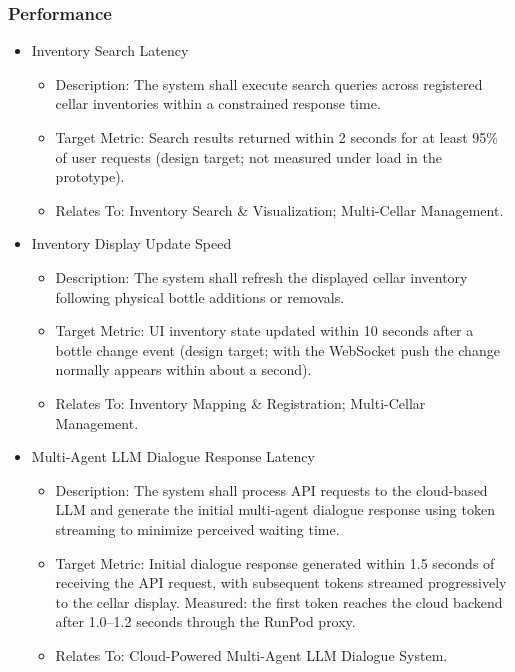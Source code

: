 \documentclass[conference]{IEEEtran}
\begin{document}
\subsubsection{Performance}
\begin{itemize}
    \item Inventory Search Latency
    \begin{itemize}
        \item Description: The system shall execute search queries across registered cellar inventories within a constrained response time.
        \item Target Metric: Search results returned within 2 seconds for at least 95\% of user requests (design target; not measured under load in the prototype).
        \item Relates To: Inventory Search \& Visualization; Multi-Cellar Management.
    \end{itemize}

    \item Inventory Display Update Speed
    \begin{itemize}
        \item Description: The system shall refresh the displayed cellar inventory following physical bottle additions or removals.
        \item Target Metric: UI inventory state updated within 10 seconds after a bottle change event (design target; with the WebSocket push the change normally appears within about a second).
        \item Relates To: Inventory Mapping \& Registration; Multi-Cellar Management.
    \end{itemize}

    \item Multi-Agent LLM Dialogue Response Latency
    \begin{itemize}
        \item Description: The system shall process API requests to the cloud-based LLM and generate the initial multi-agent dialogue response using token streaming to minimize perceived waiting time.
        \item Target Metric: Initial dialogue response generated within 1.5 seconds of receiving the API request, with subsequent tokens streamed progressively to the cellar display. Measured: the first token reaches the cloud backend after 1.0--1.2 seconds through the RunPod proxy.
        \item Relates To: Cloud-Powered Multi-Agent LLM Dialogue System.
    \end{itemize}
\end{itemize}
\end{document}
